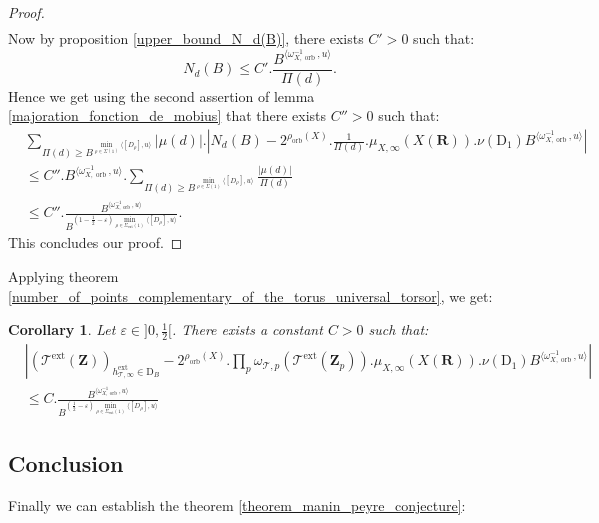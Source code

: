\documentclass{proc-l}
\newcommand{\R}{\mathbf{R}}
\newcommand{\Z}{\mathbf{Z}}
\DeclareMathOperator{\orb}{orb}
\DeclareMathOperator{\ext}{ext}
\newcommand{\stackT}{\mathcal{T}}
\newcommand{\w}{\omega}
\newtheorem{cor}[theorem]{Corollary}
\theoremstyle{definition}
\theoremstyle{remark}
\numberwithin{equation}{section}
\begin{document}
\begin{proof}
\begin{align*}
    \end{align*}
    Now by proposition \ref{upper_bound_N_d(B)}, there exists $C' > 0$ such that:
    $$N_d(B) \leqslant C'.\frac{B^{\langle \w_{X,\orb}^{-1} , u \rangle}}{\Pi(d)} .$$ Hence we get using the second assertion of lemma \ref{majoration_fonction_de_mobius} that there exists $C'' > 0$ such that:
    \begin{align*}
        &\sum\limits_{\Pi(d) \geqslant B^{\min\limits_{\rho \in \Sigma(1)} \langle [D_{\rho}] , u \rangle }} | \mu(d) | . \left| N_d(B) - 2^{\rho_{\orb}(X)} . \frac{1}{\Pi(d)} . \mu_{X,\infty}(X(\R)). \nu(\mathrm{D}_1) B^{ \langle \w_{X,\orb}^{-1} , u \rangle } \right| \\
        &\leqslant C''. B^{\langle \w_{X,\orb}^{-1},u\rangle} .\sum\limits_{\Pi(d) \geqslant B^{\min\limits_{\rho \in \Sigma(1)} \langle [D_{\rho}] , u \rangle }} \frac{| \mu(d) |}{\Pi(d)} \\
        &\leqslant C''.\frac{B^{\langle \w_{X,\orb}^{-1},u\rangle}}{B^{(1-\frac{1}{2} - \varepsilon) \min\limits_{\rho \in \Sigma_{\ext}(1)} \langle [D_{\rho}],u\rangle } } .
    \end{align*}This concludes our proof.    
\end{proof}

Applying theorem \ref{number_of_points_complementary_of_the_torus_universal_torsor}, we get:

\begin{cor}\label{conclusion_torsor_univ}
Let $\varepsilon \in ]0,\frac{1}{2}[$. There exists a constant $C > 0$ such that:
\begin{align*}
    &\left| (\stackT^{\ext}(\Z) )_{h^{\ext}_{\stackT,\infty} \in \mathrm{D}_B}  - 2^{\rho_{\orb}(X)} . \prod\limits_p \w_{\stackT,p}(\stackT^{\ext}(\Z_p)) . \mu_{X,\infty}(X(\R)). \nu(\mathrm{D}_1) B^{ \langle \w_{X,\orb}^{-1} , u \rangle } \right| \\
    &\leqslant C . \frac{B^{\langle \w_{X,\orb}^{-1} , u \rangle}}{B^{(\frac{1}{2} - \varepsilon) \min\limits_{\rho \in \Sigma_{\ext}(1)} \langle [D_{\rho}] , u \rangle }}
\end{align*}
\end{cor}

\subsection{Conclusion}

Finally we can establish the theorem \ref{theorem_manin_peyre_conjecture}:
\end{document}
